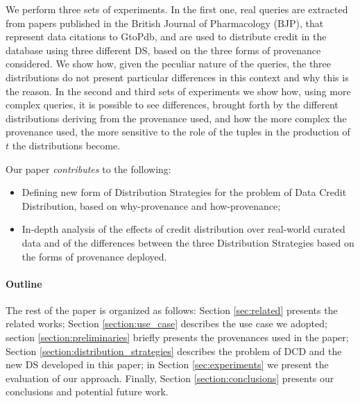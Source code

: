 We perform three sets of experiments. In the first one, real queries are extracted from papers published in the British Journal of Pharmacology (BJP), that represent data citations to GtoPdb, and are used to distribute credit in the database using three different DS, based on the three forms of provenance considered. 
We show how, given the peculiar nature of the queries, the three distributions do not present particular differences in this context and why this is the reason. 
In the second and third sets of experiments we show how, using more complex queries, it is possible to see differences, brought forth by the different distributions deriving from the provenance used, and how the more complex the provenance used, the more sensitive to the role of the tuples in the production of $t$ the distributions become.


Our paper \emph{contributes} to the following:
\begin{itemize}
    \item Defining new form of Distribution Strategies for the problem of Data Credit Distribution, based on why-provenance and how-provenance;
    \item In-depth analysis of the effects of credit distribution over real-world curated data and of the differences between the three Distribution Strategies based on the forms of provenance deployed.
\end{itemize}

\paragraph{\textbf{Outline}} The rest of the paper is organized as follows:
Section \ref{sec:related} presents the related works; Section \ref{section:use_case} describes the use case we adopted; section \ref{section:preliminaries} briefly presents the provenances used in the paper; Section \ref{section:distribution_strategies} describes the problem of DCD and the new DS developed in this paper; in Section \ref{sec:experiments} we present the evaluation of our approach. Finally, Section \ref{section:conclusions} presents our conclusions and potential future work.



 
